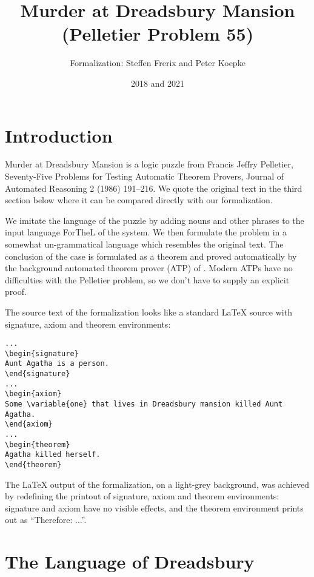 \documentclass{article}
\title{Murder at Dreadsbury Mansion (Pelletier Problem 55)}
\author{\Naproche Formalization: Steffen Frerix and Peter Koepke}
\date{2018 and 2021}
\begin{document}

\maketitle


\section{Introduction}

Murder at Dreadsbury Mansion is a logic puzzle from
Francis Jeffry Pelletier, Seventy-Five Problems for Testing
Automatic Theorem Provers, Journal of Automated Reasoning 2 (1986) 191--216.
We quote the original text in the third section below where it can
be compared directly with our formalization.

We imitate the language of the puzzle by
adding nouns and other phrases to the input language ForTheL of the \Naproche system.
We then formulate the problem in a somewhat un-grammatical language
which resembles the original text.
The conclusion of the case is formulated as a theorem and
proved automatically by the background automated theorem prover (ATP) of \Naproche. Modern
ATPs have no difficulties with the Pelletier problem, so we don't
have to supply an explicit proof.

The source text of the formalization looks like a standard \LaTeX{} source
with signature, axiom and theorem environments:

\begin{verbatim}
...
\begin{signature}
Aunt Agatha is a person.
\end{signature}
...
\begin{axiom}
Some \variable{one} that lives in Dreadsbury mansion killed Aunt Agatha.
\end{axiom}
...
\begin{theorem}
Agatha killed herself.
\end{theorem}
\end{verbatim}

The \LaTeX{} output of the formalization, on a light-grey background, was
achieved by redefining the printout of signature,
axiom and theorem environments: signature and axiom have no
visible effects, and
the theorem environment prints out as ``Therefore: ...''.


\section{The Language of Dreadsbury}
\end{document}
